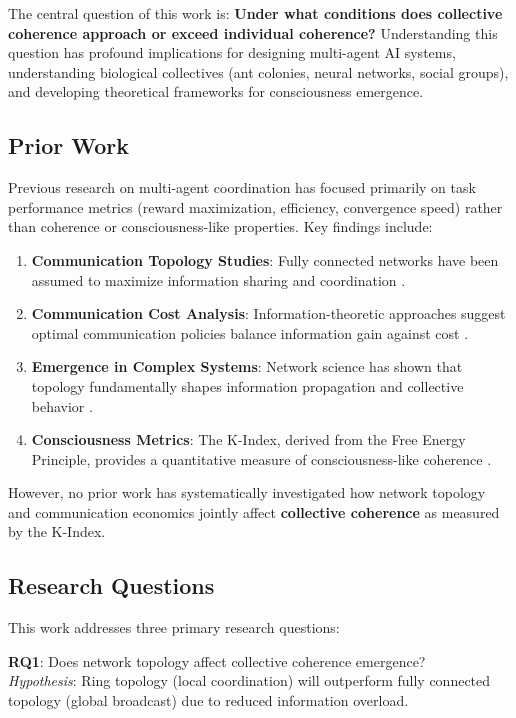 \documentclass[10pt,letterpaper]{article}
\begin{document}
The central question of this work is: \textbf{Under what conditions does collective coherence approach or exceed individual coherence?} Understanding this question has profound implications for designing multi-agent AI systems, understanding biological collectives (ant colonies, neural networks, social groups), and developing theoretical frameworks for consciousness emergence.

\subsection*{Prior Work}
Previous research on multi-agent coordination has focused primarily on task performance metrics (reward maximization, efficiency, convergence speed) rather than coherence or consciousness-like properties. Key findings include:

\begin{enumerate}
\item \textbf{Communication Topology Studies}: Fully connected networks have been assumed to maximize information sharing and coordination \cite{Stone2000,Balch1998}.
\item \textbf{Communication Cost Analysis}: Information-theoretic approaches suggest optimal communication policies balance information gain against cost \cite{Nair2005,Seuken2008}.
\item \textbf{Emergence in Complex Systems}: Network science has shown that topology fundamentally shapes information propagation and collective behavior \cite{Barabasi1999,Watts1998}.
\item \textbf{Consciousness Metrics}: The K-Index, derived from the Free Energy Principle, provides a quantitative measure of consciousness-like coherence \cite{Friston2010,Ramstead2018}.
\end{enumerate}

However, no prior work has systematically investigated how network topology and communication economics jointly affect \textbf{collective coherence} as measured by the K-Index.

\subsection*{Research Questions}
This work addresses three primary research questions:

\textbf{RQ1}: Does network topology affect collective coherence emergence?\\
\textit{Hypothesis}: Ring topology (local coordination) will outperform fully connected topology (global broadcast) due to reduced information overload.
\end{document}
